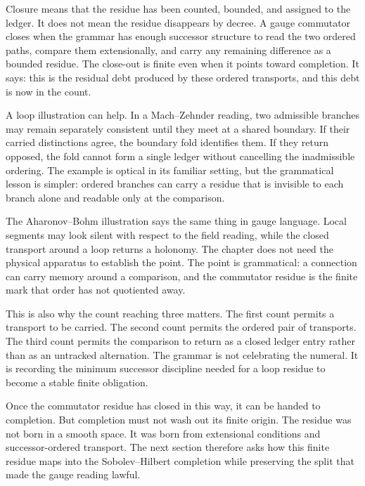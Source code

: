Closure means that the residue has been counted, bounded, and assigned to the
ledger. It does not mean the residue disappears by decree. A gauge
commutator closes when the grammar has enough successor structure to read
the two ordered paths, compare them extensionally, and carry any remaining
difference as a bounded residue. The close-out is finite even when it points
toward completion. It says: this is the residual debt produced by these
ordered transports, and this debt is now in the count.

A loop illustration can help. In a Mach--Zehnder reading, two admissible
branches may remain separately consistent until they meet at a shared
boundary. If their carried distinctions agree, the boundary fold identifies
them. If they return opposed, the fold cannot form a single ledger without
cancelling the inadmissible ordering. The example is optical in its familiar
setting, but the grammatical lesson is simpler: ordered branches can carry a
residue that is invisible to each branch alone and readable only at the
comparison.

The Aharonov--Bohm illustration says the same thing in gauge language. Local
segments may look silent with respect to the field reading, while the closed
transport around a loop returns a holonomy. The chapter does not need the
physical apparatus to establish the point. The point is grammatical: a
connection can carry memory around a comparison, and the commutator residue
is the finite mark that order has not quotiented away.

This is also why the count reaching three matters. The first count permits a
transport to be carried. The second count permits the ordered pair of
transports. The third count permits the comparison to return as a closed
ledger entry rather than as an untracked alternation. The grammar is not
celebrating the numeral. It is recording the minimum successor discipline
needed for a loop residue to become a stable finite obligation.

Once the commutator residue has closed in this way, it can be handed to
completion. But completion must not wash out its finite origin. The residue
was not born in a smooth space. It was born from extensional conditions and
successor-ordered transport. The next section therefore asks how this finite
residue maps into the Sobolev--Hilbert completion while preserving the split
that made the gauge reading lawful.
